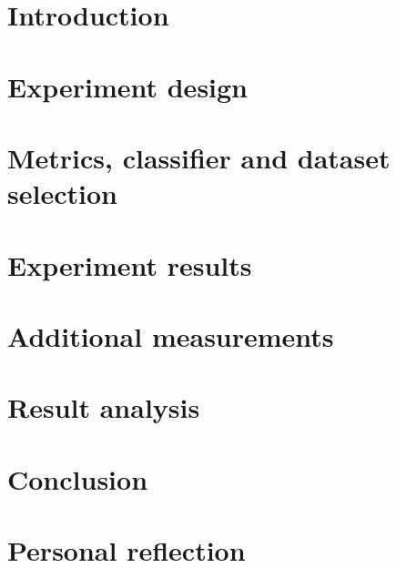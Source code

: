 \documentclass[a4paper,11pt,pdftex,oneside]{scrbook}
\begin{document}

\pagestyle{plain} 



\chapter{Introduction}
\label{sec:introduction}


\chapter{Experiment design}
\label{sec:experiment}


\chapter{Metrics, classifier and dataset selection}
\label{sec:selection}


\newpage
\chapter{Experiment results}
\label{sec:results}


\chapter{Additional measurements}
\label{sec:additional}


\chapter{Result analysis}
\label{sec:testing}



\chapter{Conclusion}
\label{sec:conclusion}


\chapter{Personal reflection}
\label{sec:reflection}




\end{document}
